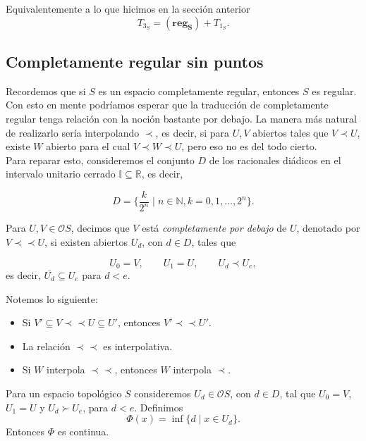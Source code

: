 Equivalentemente a lo que hicimos en la sección anterior 
\[
T_{3_S}=(\mathbf{reg_S})+T_{1_S}.
\]

\subsection{Completamente regular sin puntos}

Recordemos que si $S$ es un espacio completamente regular, entonces $S$ es regular. Con esto en mente podríamos esperar que la traducción de completamente regular tenga relación con la noción bastante por debajo. La manera más natural de realizarlo sería interpolando $\prec$, es decir, si para $U, V$ abiertos tales que $V\prec U$, existe $W$ abierto para el cual $V\prec W \prec U$, pero eso no es del todo cierto.\\

Para reparar esto, consideremos el conjunto $D$ de los racionales diádicos en el intervalo unitario cerrado $\mathbb{I}\subseteq \mathbb{R}$, es decir,

\[
D=\{\frac{k}{2^n}\mid n\in \mathbb{N}, k=0, 1, \dots , 2^n\}.
\]


\begin{dfn}\label{Cdebajo}
    Para $U,V\in \mathcal{O}S$, decimos que $V$ está \emph{completamente por debajo} de $U$, denotado por $V\prec\prec U$, si existen abiertos $U_d$, con $d\in D$, tales que 

    \[
    U_0=V, \qquad U_1=U, \qquad U_d\prec U_e,
    \]
    es decir, $\overline{U_d}\subseteq U_e$ para $d<e$.
\end{dfn}

Notemos lo siguiente:

\begin{itemize}
    \item Si $V'\subseteq V\prec \prec U\subseteq U'$, entonces $V'\prec \prec U'$.
    \item La relación $\prec\prec$ es interpolativa.
    \item Si $W$ interpola $\prec\prec$, entonces $W$ interpola $\prec$.
\end{itemize}

\begin{prop}\label{Fcontinua}
    Para un espacio topológico $S$ consideremos $U_d\in \mathcal{O}S$, con $d\in D$, tal que $U_0=V$, $U_1=U$ y $U_d\succ U_e$, para $d<e$. Definimos 
    \[
    \Phi(x)=\inf\{d\mid x\in U_d\}.
    \]
    Entonces $\Phi$ es continua.
\end{prop}

